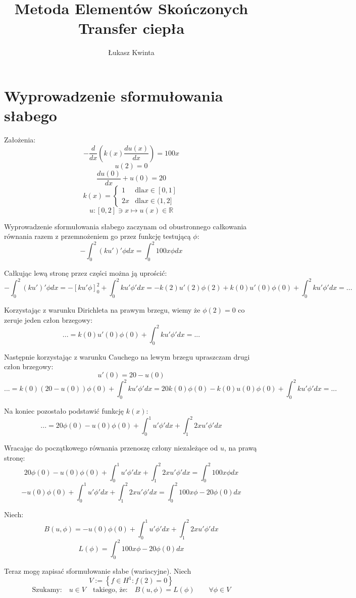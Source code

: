 \documentclass[a4paper]{article}
\title{\fontsize{30pt}{30pt}\selectfont Metoda Elementów Skończonych \\ Transfer ciepła}
\author{\fontsize{20pt}{20pt}\selectfont Łukasz Kwinta}
\date{}
\begin{document}
\maketitle
\pagebreak
\section{Wyprowadzenie sformułowania słabego}
Założenia:
\[-\frac{d}{dx}\left(k(x)\frac{du(x)}{dx}\right) = 100x \]
\[u(2) = 0\]
\[\frac{du(0)}{dx} + u(0) = 20\]
\[k(x) =
 \begin{cases}
    1  & \text{dla} x\in [0,1]\\
    2x & \text{dla} x\in (1,2]
  \end{cases}\]
  \[u: [0,2] \ni x \mapsto u(x) \in \mathbb{R}  \]

  Wyprowadzenie sformułowania słabego zaczynam od obustronnego całkowania równania 
  razem z przemnożeniem go przez funkcję testującą $\phi$:
  \[-\int_{0}^{2}(ku')'\phi dx = \int_{0}^{2}100x\phi dx\]

  Całkując lewą stronę przez części można ją uprościć:
  \[-\int_{0}^{2}(ku')'\phi dx = -\left[ku'\phi\right]_0^2 + \int_{0}^{2}ku'\phi' dx
  = -k(2)u'(2)\phi(2) + k(0)u'(0)\phi(0) + \int_{0}^{2}ku'\phi' dx = ...\]

  Korzystając z warunku Dirichleta na prawym brzegu, wiemy że $\phi(2) = 0$ co zeruje jeden człon brzegowy:
  \[... = k(0)u'(0)\phi(0) + \int_{0}^{2}ku'\phi' dx = ... \]

  Następnie korzystając z warunku Cauchego na lewym brzegu upraszczam drugi człon brzegowy:
  \[u'(0) = 20 - u(0)\]
  \[... = k(0)(20 - u(0))\phi(0) + \int_{0}^{2}ku'\phi' dx = 20k(0)\phi(0) - k(0)u(0)\phi(0) + \int_{0}^{2}ku'\phi' dx = ...\]

  Na koniec pozostało podstawić funkcję $k(x)$:
  \[... = 20\phi(0) - u(0)\phi(0) + \int_{0}^{1}u'\phi' dx + \int_{1}^{2}2xu'\phi' dx\]

  Wracając do początkowego równania przenoszę człony niezależące od $u$, na prawą stronę:
  \[20\phi(0) - u(0)\phi(0) + \int_{0}^{1}u'\phi' dx + \int_{1}^{2}2xu'\phi' dx = \int_{0}^{2}100x\phi dx\]
  \[-u(0)\phi(0) + \int_{0}^{1}u'\phi' dx + \int_{1}^{2}2xu'\phi' dx = \int_{0}^{2}100x\phi -20\phi(0)dx\]

  Niech:
  \[B(u, \phi) = -u(0)\phi(0) + \int_{0}^{1}u'\phi' dx + \int_{1}^{2}2xu'\phi' dx\]
  \[L(\phi) = \int_{0}^{2}100x\phi -20\phi(0)dx\]

  Teraz mogę zapisać sformułowanie słabe (wariacyjne). Niech
  \[ V := \left\{f \in H^1 : f(2) = 0\right\} \]
  \[\text{Szukamy:} \quad u \in V \quad \text{takiego, że:} \quad B(u, \phi) = L(\phi) \qquad \forall \phi \in V \]
  \pagebreak
\end{document}
